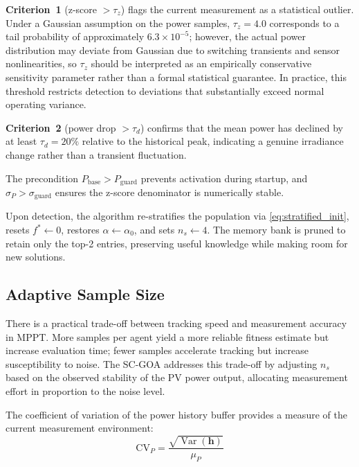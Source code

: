 \documentclass[a4paper, 12pt]{article}
\DeclareMathOperator{\Var}{Var}
\begin{document}
\textbf{Criterion~1} (z-score $> \tau_z$) flags the current measurement as a statistical outlier. Under a Gaussian assumption on the power samples, $\tau_z = 4.0$ corresponds to a tail probability of approximately $6.3 \times 10^{-5}$; however, the actual power distribution may deviate from Gaussian due to switching transients and sensor nonlinearities, so $\tau_z$ should be interpreted as an empirically conservative sensitivity parameter rather than a formal statistical guarantee. In practice, this threshold restricts detection to deviations that substantially exceed normal operating variance.

\textbf{Criterion~2} (power drop $> \tau_d$) confirms that the mean power has declined by at least $\tau_d = 20\%$ relative to the historical peak, indicating a genuine irradiance change rather than a transient fluctuation.

The precondition $P_{\mathrm{base}} > P_{\mathrm{guard}}$ prevents activation during startup, and $\sigma_P > \sigma_{\mathrm{guard}}$ ensures the z-score denominator is numerically stable.

Upon detection, the algorithm re-stratifies the population via \cref{eq:stratified_init}, resets $f^{*} \leftarrow 0$, restores $\alpha \leftarrow \alpha_0$, and sets $n_s \leftarrow 4$. The memory bank is pruned to retain only the top-2 entries, preserving useful knowledge while making room for new solutions.


\subsection{Adaptive Sample Size}
\label{subsec:adaptive_sample}

There is a practical trade-off between tracking speed and measurement accuracy in MPPT. More samples per agent yield a more reliable fitness estimate but increase evaluation time; fewer samples accelerate tracking but increase susceptibility to noise. The SC-GOA addresses this trade-off by adjusting $n_s$ based on the observed stability of the PV power output, allocating measurement effort in proportion to the noise level.

The coefficient of variation of the power history buffer provides a measure of the current measurement environment:
\begin{equation}
    \mathrm{CV}_P = \frac{\sqrt{\Var(\mathbf{h})}}{\mu_P}
    \label{eq:cv_power}
\end{equation}
\end{document}
